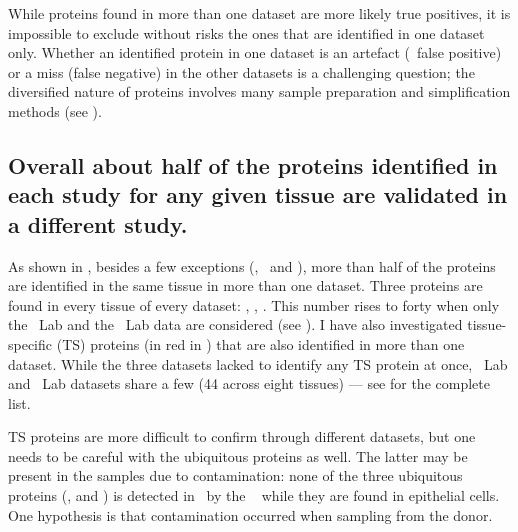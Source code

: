 While proteins found in more than one dataset are more likely true positives,
it is impossible to exclude without risks the ones
that are identified in one dataset only.
Whether an identified protein in one dataset is
an artefact (\ie\ false positive) or a miss (false negative) in the other datasets
is a challenging question;
the diversified nature of proteins involves
many sample preparation and simplification methods
(see ).\mybr\



\subsection{Overall about half of the proteins identified
in each study for any given tissue
are validated in a different study.}\label{subsec:halfProtConfirmed}

As shown in ,
besides a few exceptions (\oesophagus, \gall\ and \testis),
more than half of the proteins are identified in the same tissue
in more than one dataset.
Three proteins are found in every tissue of every dataset:
,  , .
This number rises to forty when only the \pandey\ Lab and the \kuster\ Lab data
are considered (see ).
I have also investigated tissue-specific (\gls{TS}) proteins
(in red in )
that are also identified in more than one dataset.
While the three datasets lacked to identify any \gls{TS} protein at once,
\pandey\ Lab and \kuster\ Lab datasets share a few (44 across eight tissues)
--- see  for the complete list.\mybr\
\begin{comment}
twelve for \kidney, nine for \placenta, seven for \pancreas,
five for \adrenal\ and \liver, four for \testis,
and one for \prostate\ and \rectum.
\end{comment}

\gls{TS} proteins are more difficult to confirm
through different datasets,
but one needs to be careful with the ubiquitous proteins as well.
The latter may be present in the samples due to contamination:
none of the three ubiquitous proteins
(,   and )
is detected in \heart\ by the
~
while they are found in epithelial cells.
One hypothesis is that contamination occurred when sampling from the donor.\mybr\

